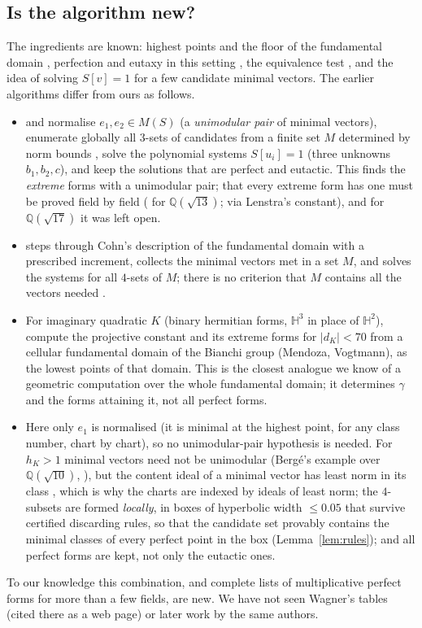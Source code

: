 \documentclass[11pt]{amsart}
\theoremstyle{definition}
\theoremstyle{remark}
\newcommand{\Q}{\mathbb{Q}}
\newcommand{\Hb}{\mathbb{H}}
\begin{document}
\subsection{Is the algorithm new?}\label{subsec:new}
The ingredients are known: highest points and the floor of the fundamental domain
\cite{Cohn1,BCIO,PW09}, perfection and eutaxy in this setting \cite{Coulangeon}, the
equivalence test \cite[Alg.~11]{PW05}, and the idea of solving $S[v]=1$ for a few candidate
minimal vectors.  The earlier algorithms differ from ours as follows.
\begin{itemize}[leftmargin=*]
\item \cite[Alg.~9]{PW05} and \cite{BCIO,CIO} normalise $e_1,e_2\in M(S)$ (a \emph{unimodular
pair} of minimal vectors), enumerate globally all $3$-sets of candidates from a finite set $M$
determined by norm bounds \cite[Lemmas~7, 8]{PW05}, solve the polynomial systems $S[u_i]=1$
(three unknowns $b_1,b_2,c$), and keep the solutions that are perfect and eutactic.  This
finds the \emph{extreme} forms with a unimodular pair; that every extreme form has one must be
proved field by field (\cite[Lemma~16]{PW05} for $\Q(\sqrt{13})$; \cite[Props.~2.9, 2.10]{CIO}
via Lenstra's constant), and for $\Q(\sqrt{17})$ it was left open.
\item \cite[\S2]{PW09} steps through Cohn's description of the fundamental domain with a
prescribed increment, collects the minimal vectors met in a set $M$, and solves the systems
for all $4$-sets of $M$; there is no criterion that $M$ contains all the vectors needed
\cite[p.~940]{PW09}.
\item For imaginary quadratic $K$ (binary hermitian forms, $\Hb^3$ in place of $\Hb^2$),
\cite{CIL} compute the projective constant and its extreme forms for $|d_K|<70$ from a cellular
fundamental domain of the Bianchi group (Mendoza, Vogtmann), as the lowest points of that
domain.  This is the closest analogue we know of a geometric computation over the whole
fundamental domain; it determines $\gamma$ and the forms attaining it, not all perfect forms.
\item Here only $e_1$ is normalised (it is minimal at the highest point, for any class
number, chart by chart), so no unimodular-pair hypothesis is needed.  For $h_K>1$ minimal
vectors need not be unimodular (Berg\'e's example over $\Q(\sqrt{10})$, \cite[\S2]{BI97}), but the
content ideal of a minimal vector has least norm in its class \cite[\S2]{BI97}, which is why the
charts are indexed by ideals of least norm; the $4$-subsets are
formed \emph{locally}, in boxes of hyperbolic width $\le0.05$ that survive certified
discarding rules, so that the candidate set provably contains the minimal classes of every
perfect point in the box (Lemma~\ref{lem:rules}); and all perfect forms are kept, not only the
eutactic ones.
\end{itemize}
To our knowledge this combination, and complete lists of multiplicative perfect forms for more
than a few fields, are new.  We have not seen Wagner's tables \cite{PW09} (cited there as a web
page) or later work by the same authors.
\end{document}
